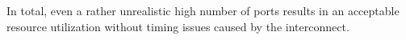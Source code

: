 In total, even a rather unrealistic high number of ports results in an
acceptable resource utilization without timing issues caused by the
interconnect.




